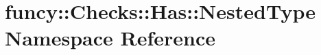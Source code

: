 \hypertarget{namespacefuncy_1_1Checks_1_1Has_1_1NestedType}{\section{funcy\-:\-:Checks\-:\-:Has\-:\-:Nested\-Type Namespace Reference}
\label{namespacefuncy_1_1Checks_1_1Has_1_1NestedType}
}
